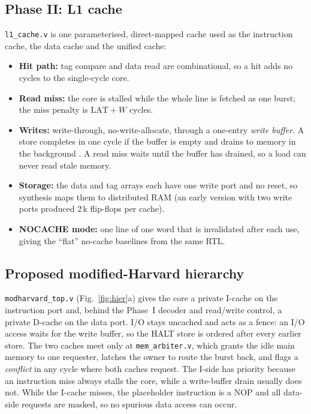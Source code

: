 \documentclass[conference]{IEEEtran}
\begin{document}
\subsection{Phase II: L1 cache}
\texttt{l1\_cache.v} is one parameterised, direct-mapped cache used as the
instruction cache, the data cache and the unified cache:
\begin{itemize}
\item \textbf{Hit path:} tag compare and data read are combinational, so a hit
adds no cycles to the single-cycle core.
\item \textbf{Read miss:} the core is stalled while the whole line is fetched
as one burst; the miss penalty is $\text{LAT}+W$ cycles.
\item \textbf{Writes:} write-through, no-write-allocate, through a one-entry
\emph{write buffer}. A store completes in one cycle if the buffer is empty and
drains to memory in the background \cite{jouppi1993}. A read miss waits until
the buffer has drained, so a load can never read stale memory.
\item \textbf{Storage:} the data and tag arrays each have one write port and
no reset, so synthesis maps them to distributed RAM (an early version with two
write ports produced 2\,k flip-flops per cache).
\item \textbf{NOCACHE mode:} one line of one word that is invalidated after
each use, giving the ``flat'' no-cache baselines from the same RTL.
\end{itemize}

\subsection{Proposed modified-Harvard hierarchy}
\texttt{modharvard\_top.v} (Fig.~\ref{fig:hier}a) gives the core a private
I-cache on the instruction port and, behind the Phase~I decoder and read/write
control, a private D-cache on the data port. I/O stays uncached and acts as a
fence: an I/O access waits for the write buffer, so the HALT store is ordered
after every earlier store. The two caches meet only at \texttt{mem\_arbiter.v},
which grants the idle main memory to one requester, latches the owner to route
the burst back, and flags a \emph{conflict} in any cycle where both caches
request. The I-side has priority because an instruction miss always stalls
the core, while a write-buffer drain usually does not. While the I-cache
misses, the placeholder instruction is a NOP and all data-side requests are
masked, so no spurious data access can occur.
\end{document}
